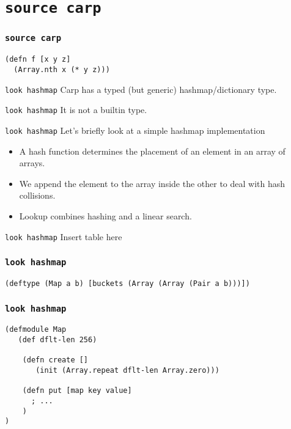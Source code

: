 \documentclass{beamer}
\begin{document}
  \section{\texttt{source carp}}
  \begin{frame}[fragile]
  \frametitle{\texttt{source carp}}
    \begin{listing}[H]
      \caption{A silly Carp function}
      \begin{verbatim}
(defn f [x y z]
  (Array.nth x (* y z)))
      \end{verbatim}
    \end{listing}
  \end{frame}
  \begin{frame}{\texttt{look hashmap}}
      Carp has a typed (but generic) hashmap/dictionary type.
  \end{frame}
  \begin{frame}{\texttt{look hashmap}}
      It is not a builtin type.
  \end{frame}
  \begin{frame}{\texttt{look hashmap}}
      Let’s briefly look at a simple hashmap implementation
      \begin{itemize}
        \item A hash function determines the placement of an element in an array of arrays.
        \item We append the element to the array inside the other to deal with hash collisions.
        \item Lookup combines hashing and a linear search.
      \end{itemize}
  \end{frame}
  \begin{frame}{\texttt{look hashmap}}
    Insert table here
  \end{frame}
  \begin{frame}[fragile]
    \frametitle{\texttt{look hashmap}}
    \begin{listing}[H]
      \caption{The hashmap type, simplified.}
      \begin{verbatim}
(deftype (Map a b) [buckets (Array (Array (Pair a b)))])
      \end{verbatim}
    \end{listing}
  \end{frame}
  \begin{frame}[fragile]
    \frametitle{\texttt{look hashmap}}
    \begin{listing}[H]
      \caption{The hashmap module, with omissions.}
      \begin{verbatim}
(defmodule Map
   (def dflt-len 256)

    (defn create []
       (init (Array.repeat dflt-len Array.zero)))

    (defn put [map key value]
      ; ...
    )
)
      \end{verbatim}
    \end{listing}
  \end{frame}
\end{document}
